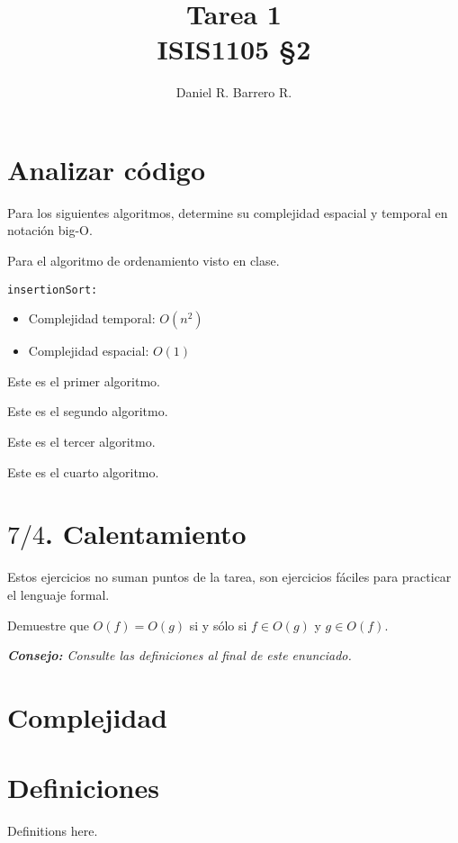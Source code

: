 \documentclass{amsart}
\title{Tarea 1 \\ ISIS1105 \S 2}
\author{Daniel R. Barrero R.}
\begin{document}
\maketitle


\section{Analizar código}

Para los siguientes algoritmos, determine su complejidad espacial y temporal en
notación big-O.

\begin{ejem*}
	Para el algoritmo de ordenamiento visto en clase.

	\texttt{insertionSort:}
	\begin{itemize}
		\item Complejidad temporal: $O(n^2)$
		\item Complejidad espacial: $O(1)$
	\end{itemize}
\end{ejem*}

\begin{ejer}
	Este es el primer algoritmo.

	
\end{ejer}

\begin{ejer}
	Este es el segundo algoritmo.

	
\end{ejer}

\begin{ejer}
	Este es el tercer algoritmo.

	
\end{ejer}

\begin{ejer}
	Este es el cuarto algoritmo.

	
\end{ejer}

\section*{$7/4$. Calentamiento}

Estos ejercicios no suman puntos de la tarea, son ejercicios fáciles para practicar el lenguaje formal.

\begin{ejer*}
	Demuestre que $O(f) = O(g)$ si y sólo si $f \in O(g)$ y $g \in O(f)$.
\end{ejer*}

\emph{\textbf{Consejo:} Consulte las
definiciones al final de este enunciado.}

\section{Complejidad}

\newpage
\thispagestyle{plain}

\section*{Definiciones}

Definitions here.
\end{document}
